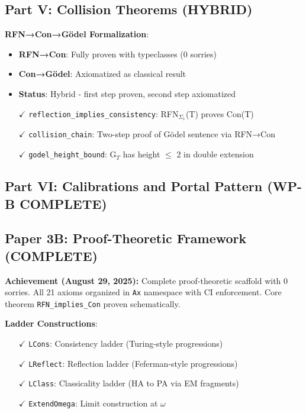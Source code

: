 \documentclass[11pt]{article}
\theoremstyle{definition}
\theoremstyle{remark}
\begin{document}
\subsection{Part V: Collision Theorems (HYBRID)}

\textbf{RFN→Con→Gödel Formalization}:
\begin{itemize}
\item \textbf{RFN→Con}: Fully proven with typeclasses (0 sorries)
\item \textbf{Con→Gödel}: Axiomatized as classical result
\item \textbf{Status}: Hybrid - first step proven, second step axiomatized
\item[$\checkmark$] \texttt{reflection\_implies\_consistency}: RFN$_{\Sigma_1}$(T) proves Con(T) 
\item[$\checkmark$] \texttt{collision\_chain}: Two-step proof of Gödel sentence via RFN→Con
\item[$\checkmark$] \texttt{godel\_height\_bound}: G$_T$ has height $\leq$ 2 in double extension
\end{itemize}

\subsection{Part VI: Calibrations and Portal Pattern (WP-B COMPLETE)}

\subsection{Paper 3B: Proof-Theoretic Framework (COMPLETE)}

\begin{mdframed}[style=achievement]
\textbf{Achievement (August 29, 2025):} Complete proof-theoretic scaffold with 0 sorries. All 21 axioms organized in \texttt{Ax} namespace with CI enforcement. Core theorem \texttt{RFN\_implies\_Con} proven schematically.
\end{mdframed}

\textbf{Ladder Constructions}:
\begin{itemize}
\item[$\checkmark$] \texttt{LCons}: Consistency ladder (Turing-style progressions)
\item[$\checkmark$] \texttt{LReflect}: Reflection ladder (Feferman-style progressions)  
\item[$\checkmark$] \texttt{LClass}: Classicality ladder (HA to PA via EM fragments)
\item[$\checkmark$] \texttt{ExtendOmega}: Limit construction at $\omega$
\end{itemize}
\end{document}
